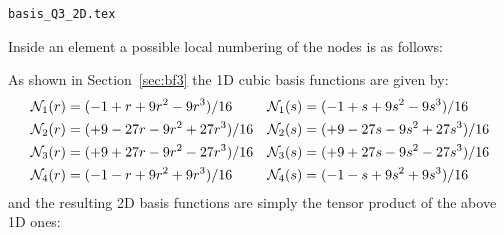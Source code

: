 \begin{flushright} {\tiny {\color{gray} \tt basis\_Q3\_2D.tex}} \end{flushright}

Inside an element a possible local numbering of the nodes is as follows:



As shown in Section~\ref{sec:bf3} the 1D cubic basis functions are given by:
\begin{align}
{\mathcal{N}}_1(r)&=(-1   +r +9r^2 - 9r^3)/16 & {\mathcal{N}}_1(s)&=(-1   +s +9s^2 - 9s^3)/16 \nonumber\\
{\mathcal{N}}_2(r)&=(+9 -27r -9r^2 +27r^3)/16 & {\mathcal{N}}_2(s)&=(+9 -27s -9s^2 +27s^3)/16 \nonumber\\
{\mathcal{N}}_3(r)&=(+9 +27r -9r^2 -27r^3)/16 & {\mathcal{N}}_3(s)&=(+9 +27s -9s^2 -27s^3)/16 \nonumber\\
{\mathcal{N}}_4(r)&=(-1   -r +9r^2 + 9r^3)/16 & {\mathcal{N}}_4(s)&=(-1   -s +9s^2 + 9s^3)/16 \nonumber
\end{align}
and the resulting 2D basis functions are simply the tensor product of the above 1D ones:

